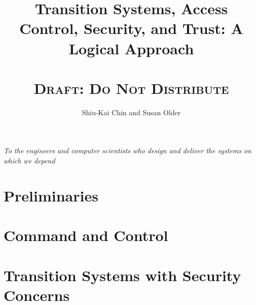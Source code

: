\documentclass[final]{our-book}
\newcounter{count} \newcounter{restart}
\begin{document}



\title{Transition Systems, Access Control, Security, and Trust: A
  Logical Approach \\
\ \\ \textsc{Draft: Do Not Distribute }
}

\author{Shiu-Kai Chin and Susan Older}

\maketitle


\frontmatter
\thispagestyle{empty}

\begin{center}
  \textit{To the engineers and computer scientists who design and
    deliver the systems on which we depend} \\
\end{center}

\clearpage


\setcounter{page}{6}

\tableofcontents
\listoftables
\listoffigures


\mainmatter


\part{Preliminaries}







\part{Command and Control}




\part{Transition Systems with Security Concerns}



\appendix




\cleardoublepage
{}



\end{document}
